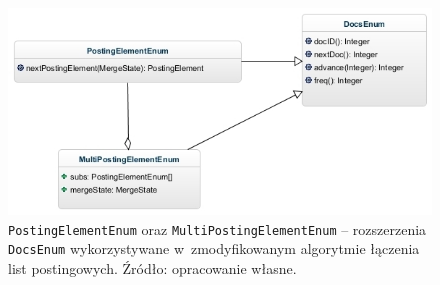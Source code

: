 \begin{figure}[here]
 \includegraphics[scale=0.7]{pictures/PostingEnums.jpg}
 \caption{\texttt{PostingElementEnum} oraz \texttt{MultiPostingElementEnum} -- rozszerzenia \texttt{DocsEnum} wykorzystywane w~zmodyfikowanym algorytmie łączenia list postingowych. Źródło: opracowanie własne. \label{fig:postingEnums}}
\end{figure}


